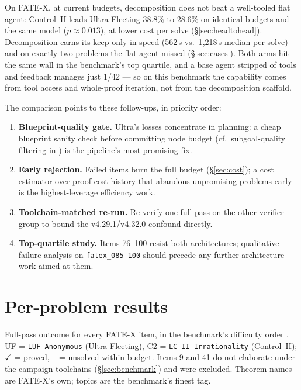 \documentclass[12pt, a4paper]{article}
\newcommand{\run}[1]{\texttt{#1}}
\newcommand{\cmark}{$\checkmark$}
\begin{document}
On FATE-X, at current budgets, decomposition does not beat a well-tooled flat
agent: Control~II leads Ultra Fleeting 38.8\% to 28.6\% on identical budgets and
the same model ($p\approx0.013$), at lower cost per solve
(\S\ref{sec:headtohead}). Decomposition earns its keep only in speed (562\,s
vs.\ 1{,}218\,s median per solve) and on exactly two problems the flat agent
missed (\S\ref{sec:cases}). Both arms hit the same wall in the benchmark's top
quartile, and a base agent stripped of tools and feedback manages just 1/42 ---
so on this benchmark the capability comes from tool access and whole-proof
iteration, not from the decomposition scaffold.

The comparison points to these follow-ups, in priority order:

\begin{enumerate}[itemsep=2pt]
\item \textbf{Blueprint-quality gate.} Ultra's losses concentrate in planning:
      a cheap blueprint sanity check before committing node budget (cf.\
      subgoal-quality filtering in \cite{deepseekproverv2}) is the pipeline's
      most promising fix.
\item \textbf{Early rejection.} Failed items burn the full budget
      (\S\ref{sec:cost}); a cost estimator over proof-cost history that abandons
      unpromising problems early is the highest-leverage efficiency work.
\item \textbf{Toolchain-matched re-run.} Re-verify one full pass on the other
      verifier group to bound the v4.29.1/v4.32.0 confound directly.
\item \textbf{Top-quartile study.} Items 76--100 resist both architectures;
      qualitative failure analysis on \run{fatex\_085}--\run{100} should
      precede any further architecture work aimed at them.
\end{enumerate}

\newpage
\printbibliography

\newpage
\appendix
\section{Per-problem results}
\label{app:items}

Full-pass outcome for every FATE-X item, in the benchmark's difficulty order
\cite{fatex2025}. UF = \run{LUF-Anonymous} (Ultra Fleeting), C2 =
\run{LC-II-Irrationality} (Control~II); \cmark{} = proved, -- = unsolved
within budget. Items 9 and 41 do not elaborate under the campaign toolchains
(\S\ref{sec:benchmark}) and were excluded. Theorem names are FATE-X's own;
topics are the benchmark's finest tag.
\end{document}
